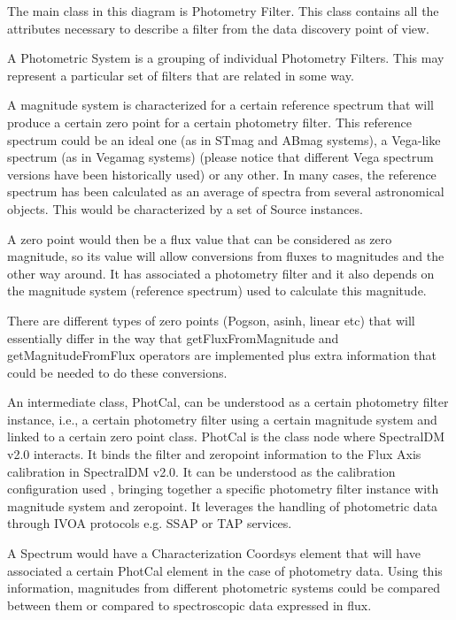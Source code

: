 \documentclass[11pt,a4paper]{ivoa}
\begin{document}
The main class in this diagram is Photometry Filter. This class contains all the attributes necessary to describe a filter from the data discovery point of view. 
\par

A Photometric System is a grouping of individual Photometry Filters. This may represent a particular set of filters that are related in some way.
\par

A magnitude system is characterized for a certain reference spectrum that will produce a certain zero point for a certain photometry filter. This reference spectrum could be an ideal one (as in STmag and ABmag systems), a Vega-like spectrum (as in Vegamag systems) (please notice that different Vega spectrum versions have been historically used) or any other. In many cases, the reference spectrum has been calculated as an average of spectra from several astronomical objects. This would be characterized by a set of Source instances.
\par

A zero point would then be a flux value that can be considered as zero magnitude, so its value will allow conversions from fluxes to magnitudes and the other way around. It has associated a photometry filter and it also depends on the magnitude system (reference spectrum) used to calculate this magnitude.
\par

There are different types of zero points (Pogson, asinh, linear etc) that will essentially differ in the way that getFluxFromMagnitude and getMagnitudeFromFlux operators are implemented plus extra information that could be needed to do these conversions.
\par

An intermediate class, PhotCal, can be understood as a certain photometry filter instance, i.e., a certain photometry filter using a certain magnitude system and linked to a certain zero point class. PhotCal is the class node where SpectralDM v2.0 interacts. It binds the filter and zeropoint information to the Flux Axis calibration in SpectralDM v2.0. It can be understood as the calibration configuration used , bringing together a specific photometry filter instance with magnitude system and zeropoint. It leverages the handling of photometric data through IVOA protocols e.g. SSAP or TAP services.
\par

A Spectrum would have a Characterization Coordsys element that will have associated a certain PhotCal element in the case of photometry data. Using this information, magnitudes from different photometric systems could be compared between them or compared to spectroscopic data expressed in flux.
\par
\end{document}
